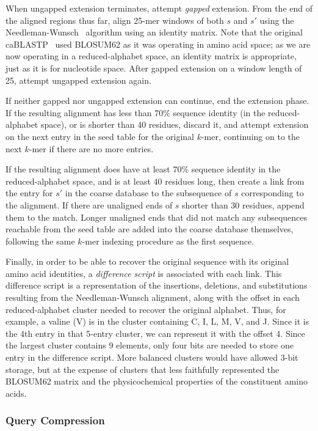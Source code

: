 \documentclass{amsbook}
\theoremstyle{definition}
\theoremstyle{remark}
\numberwithin{equation}{section}
\begin{document}
When ungapped extension terminates, attempt \textit{gapped} extension.
From the end of the aligned regions thus far, align 25-mer windows of both
$s$ and $s'$ using the Needleman-Wunsch~\cite{Needleman:1970gm} algorithm using
an identity matrix.
Note that the original caBLASTP~\cite{Daniels:2013} used BLOSUM62 as it was
operating in amino acid space; as we are now operating in a reduced-alphabet
space, an identity matrix is appropriate, just as it is for nucleotide space.
After gapped extension on a window length of 25, attempt ungapped extension
again.

If neither gapped nor ungapped extension can continue, end the extension phase.
If the resulting alignment has less than 70\% sequence identity (in the 
reduced-alphabet space), or is shorter than 40 residues, discard it, and 
attempt extension on the next entry in the seed table for the original $k$-mer,
continuing on to the next $k$-mer if there are no more entries.

If the resulting alignment does have at least 70\% sequence identity in the
reduced-alphabet space, and is at least 40 residues long, then create a link
from the entry for $s'$ in the coarse database to the subsequence of $s$
corresponding to the alignment.
If there are unaligned ends of $s$ shorter than 30 residues, append them to the
match.
Longer unaligned ends that did not match any subsequences reachable from the
seed table are added into the coarse database themselves, following the same
$k$-mer indexing procedure as the first sequence.

Finally, in order to be able to recover the original sequence with its original
amino acid identities, a \textit{difference script} is associated with each
link.
This difference script is a representation of the insertions, deletions, and
substitutions resulting from the Needleman-Wunsch alignment, along with the
offset in each reduced-alphabet cluster needed to recover the original alphabet.
Thus, for example, a valine (V) is in the cluster containing C, I, L, M, V, and 
J.
Since it is the 4th entry in that 5-entry cluster, we can represent it with
the offset 4.
Since the largest cluster contains 9 elements, only four bits are needed to
store one entry in the difference script.
More balanced clusters would have allowed 3-bit storage, but at the expense of
clusters that less faithfully represented the BLOSUM62 matrix and the
physicochemical properties of the constituent amino acids.

\subsubsection*{Query Compression}
\end{document}
